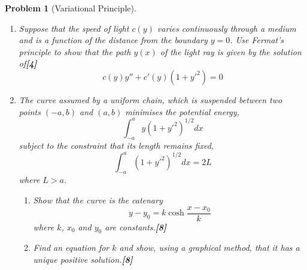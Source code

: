 \documentclass[a4paper]{article}
\theoremstyle{new}
\newtheorem{qns}{Problem}[section]
\begin{document}
\newpage
\begin{qns}[Variational Principle]\leavevmode
\begin{enumerate}[label=(\alph*)]
\item Suppose that the speed of light $c(y)$ varies continuously through a medium and is a function of the distance from the boundary $y = 0$. Use Fermat’s principle to show that the path $y(x)$ of the light ray is given by the solution of\hfill\textbf{[4]}
$$c(y)y''+c'(y)(1+y'^2)=0$$
\item The curve assumed by a uniform chain, which is suspended between two points $(−a, b)$ and $(a, b)$ minimises the potential energy,
$$\int_{-a}^ay(1+y'^2)^{1/2}dx$$
subject to the constraint that its length remains fixed,
$$\int_{-a}^a(1+y'^2)^{1/2}dx=2L$$
where $L>a$.
\begin{enumerate}[label=(\roman*)]
\item Show that the curve is the catenary
$$y-y_0=k\cosh\frac{x-x_0}{k}$$
where $k$, $x_0$ and $y_0$ are constants.\hfill\textbf{[8]}
\item Find an equation for $k$ and show, using a graphical method, that it has a unique positive solution.\hfill\textbf{[8]}
\end{enumerate}
\end{enumerate}
\end{qns}
\end{document}
